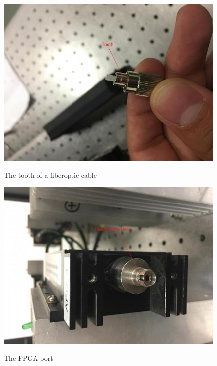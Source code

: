 \documentclass{../lab}
\begin{document}
\begin{figure}[H]
\captionsetup{justification=centering}
  \href{http://experimentationlab.berkeley.edu/sites/default/files/QIE/fiberopticcable_0_0_1.JPG}{\includegraphics[width=\linewidth,keepaspectratio]{images/fiberopticcable_0_0_1.JPG}}
  \caption{The tooth of a fiberoptic cable}
  \label{fig:fiberopticcable_0_0_1.JPG}
\endminipage\hfill
{}
  \href{http://experimentationlab.berkeley.edu/sites/default/files/QIE/fpgaport_0_1.JPG}{\includegraphics[width=\linewidth,keepaspectratio]{images/fpgaport_0_1.JPG}}
  \caption{The FPGA port}
  \label{fig:fpgaport_0_1.JPG}
\endminipage\hfill
{}

\end{figure}
\end{document}
